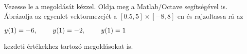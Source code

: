 Vezesse le a 
\de{} megoldását kézzel. 
Oldja meg a Matlab/Octave   segítségével is. 
Ábrázolja az egyenlet vektormezejét a $[0.5,5]\times [-8,8]$-en és rajzoltassa rá 
az 
\centerline{$y(1)=-6, \hspace{0.8cm} y(1)=-2, \hspace{0.8cm} y(1)=1$} 
kezdeti értékekhez tartozó megoldásokat is.


